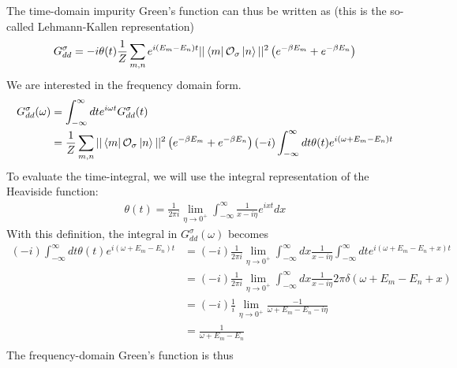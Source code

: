 \documentclass[reprint,hidelinks,onecolumn]{revtex4-2}
\begin{document}
The time-domain impurity Green's function can thus be written as (this is the so-called Lehmann-Kallen representation)
\begin{equation}\begin{aligned}
	G_{dd}^\sigma = -i\theta(t)\frac{1}{Z}\sum_{m,n}e^{i\left( E_m - E_n \right)  t}||\bra{m}\mathcal{O}_{\sigma}\ket{n}||^2\left( e^{-\beta E_m} + e^{-\beta E_n}\right)\\
\end{aligned}\end{equation}
We are interested in the frequency domain form.
\begin{equation}\begin{aligned}
	G_{d d}^\sigma(\omega) &= \int_{-\infty}^\infty dt e^{i \omega t}G_{d d}^\sigma(t) \\
			       &= \frac{1}{Z}\sum_{m,n}||\bra{m}\mathcal{O}_{\sigma}\ket{n}||^2\left( e^{-\beta E_m} + e^{-\beta E_n}\right)\left(-i\right)\int_{-\infty}^\infty dt \theta(t)e^{i\left( \omega + E_m - E_n \right)t}
\end{aligned}\end{equation}
To evaluate the time-integral, we will use the integral representation of the Heaviside function:
\begin{equation}\begin{aligned}
	\theta(t) = \frac{1}{2\pi i}\lim_{\eta \to 0^+} \int_{-\infty}^\infty \frac{1}{x- i\eta}e^{ixt}dx
\end{aligned}\end{equation}
With this definition, the integral in \(G_{dd}^\sigma(\omega)\) becomes
\begin{equation}\begin{aligned}
	\left(-i\right)\int_{-\infty}^\infty dt \theta(t)e^{i\left( \omega + E_m - E_n \right)t} &= \left(-i\right)\frac{1}{2\pi i}\lim_{\eta \to 0^+} \int_{-\infty}^\infty dx\frac{1}{x- i\eta}\int_{-\infty}^\infty dt e^{i\left( \omega + E_m - E_n + x\right)t} \\
									     &=\left(-i\right)\frac{1}{2\pi i}\lim_{\eta \to 0^+} \int_{-\infty}^\infty dx\frac{1}{x- i\eta} 2\pi \delta\left( \omega + E_m - E_n + x\right) \\
									     &=\left(-i\right)\frac{1}{i}\lim_{\eta \to 0^+} \frac{-1}{\omega + E_m - E_n- i\eta} \\
									     &=\frac{1}{\omega + E_m - E_n} \\
\end{aligned}\end{equation}
The frequency-domain Green's function is thus
\end{document}
